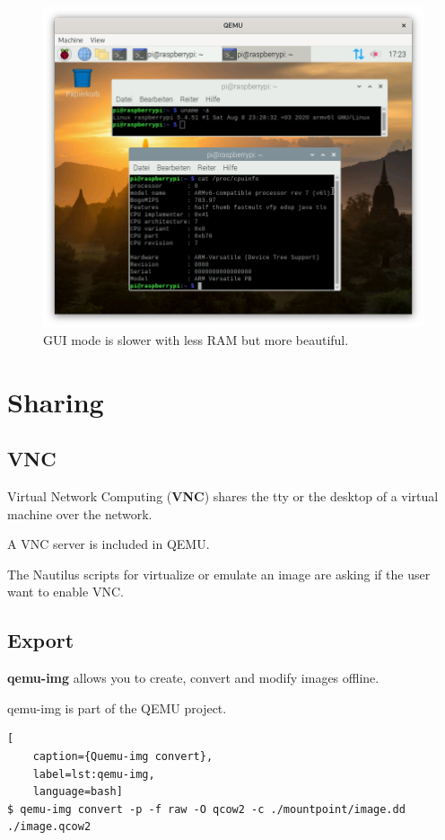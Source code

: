\begin{figure}[htbp]  %
  \centering
  \includegraphics[width=.75\textwidth]{figures/boot-rpi-with-gui.png}
  \caption[Qemu RPi GUI]{GUI mode is slower with less RAM but more beautiful.}
  \label{fig:gui}
\end{figure}

\section{Sharing}

\subsection{VNC}

Virtual Network Computing (\textbf{VNC}) shares the tty or the desktop of a virtual machine over the network.

A VNC server is included in QEMU.

The Nautilus scripts for virtualize or emulate an image are asking if the user want to enable VNC.

\subsection{Export}

\textbf{qemu-img} allows you to create, convert and modify images offline.

qemu-img is part of the QEMU project.

\begin{lstlisting}[
    caption={Quemu-img convert},
    label=lst:qemu-img,
    language=bash]
$ qemu-img convert -p -f raw -O qcow2 -c ./mountpoint/image.dd ./image.qcow2
\end{lstlisting}

